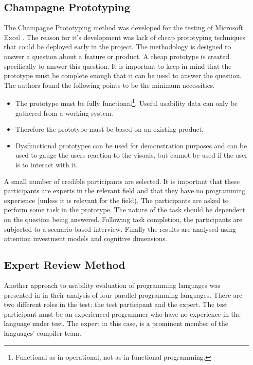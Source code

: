 \subsection{Champagne Prototyping} \label{sec:champagne}
The Champagne Prototyping method was developed for the testing of Microsoft Excel \cite{blackwell2004champagne}. The reason for it's development was lack of cheap prototyping techniques that could be deployed early in the project. The methodology is designed to answer a question about a feature or product. A cheap prototype is created specifically to answer this question. It is important to keep in mind that the prototype must be complete enough that it can be used to answer the question. The authors found the following points to be the minimum necessities.
\begin{itemize}
    \item The prototype must be fully functional\footnote{Functional as in operational, not as in functional programming.}. Useful usability data can only be gathered from a working system.
    \item Therefore the prototype must be based on an existing product.
    \item Dysfunctional prototypes can be used for demonstration purposes and can be used to gauge the users reaction to the visuals, but cannot be used if the user is to interact with it.
\end{itemize}
A small number of credible participants are selected. It is important that these participants are experts in the relevant field and that they have no programming experience (unless it is relevant for the field). The participants are asked to perform some task in the prototype. The nature of the task should be dependent on the question being answered. Following task completion, the participants are subjected to a scenario-based interview. Finally the results are analysed using attention investment models and cognitive dimensions.

\subsection{Expert Review Method}
Another approach to usability evaluation of programming languages was presented in \cite{nanz2013examining} in their analysis of four parallel programming languages. There are two different roles in the test; the test participant and the expert. The test participant must be an experienced programmer who have no experience in the language under test. The expert in this case, is a prominent member of the languages' compiler team.

